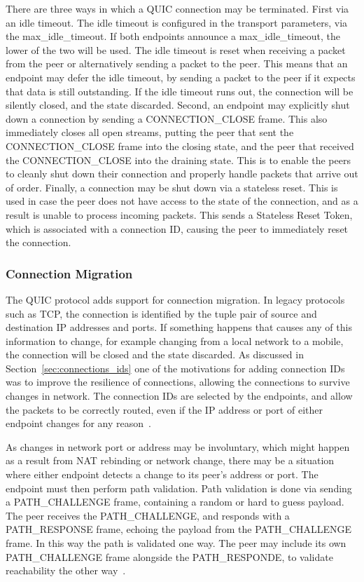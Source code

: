 \documentclass[english, 12pt, a4paper, elec, utf8, a-2b, online]{aaltothesis}
\begin{document}
There are three ways in which a QUIC connection may be terminated. First via an
idle timeout. The idle timeout is configured in the transport parameters, via the
max\_idle\_timeout. If both endpoints announce a max\_idle\_timeout, the lower of
the two will be used. The idle timeout is reset when receiving a packet from the 
peer or alternatively sending a packet to the peer. This means that an endpoint
may defer the idle timeout, by sending a packet to the peer if it expects that
data is still outstanding. If the idle timeout runs out, the connection will be
silently closed, and the state discarded. Second, an endpoint may explicitly
shut down a connection by sending a CONNECTION\_CLOSE frame. This also immediately
closes all open streams, putting the peer that sent the CONNECTION\_CLOSE frame into
the closing state, and the peer that received the CONNECTION\_CLOSE into the draining
state. This is to enable the peers to cleanly shut down their connection and
properly handle packets that arrive out of order. Finally, a connection may be
shut down via a stateless reset. This is used in case the peer does not have
access to the state of the connection, and as a result is unable to process incoming
packets. This sends a Stateless Reset Token, which is associated with a connection ID,
causing the peer to immediately reset the connection.

\subsubsection{Connection Migration}

The QUIC protocol adds support for connection migration. In legacy protocols such
as TCP, the connection is identified by the tuple pair of source and destination
IP addresses and ports. If something happens that causes any of this information to
change, for example changing from a local network to a mobile, the connection will
be closed and the state discarded. As discussed in Section~\ref{sec:connections_ids}
one of the motivations for adding connection IDs was to improve the resilience of
connections, allowing the connections to survive changes in network. The connection IDs
are selected by the endpoints, and allow the packets to be correctly routed,
even if the IP address or port of either endpoint changes for any reason~\cite{rfc9000}.

As changes in network port or address may be involuntary, which might happen as a
result from NAT rebinding or network change, there may be a situation where
either endpoint detects a change to its peer's address or port. The endpoint must then perform
path validation. Path validation is done via sending a PATH\_CHALLENGE frame, containing
a random or hard to guess payload. The peer receives the PATH\_CHALLENGE, and responds
with a PATH\_RESPONSE frame, echoing the payload from the PATH\_CHALLENGE frame.
In this way the path is validated one way. The peer may include its own PATH\_CHALLENGE
frame alongside the PATH\_RESPONDE, to validate reachability the other way~\cite{rfc9000}.
\end{document}
